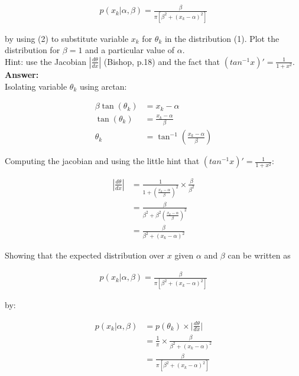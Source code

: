 \documentclass[a4paper]{article}
\begin{document}
\begin{eqnarray}
p(x_k | \alpha, \beta) = \frac{\beta}{\pi [\beta^2 + (x_k - \alpha)^2 ]}
\end{eqnarray}

by using (2) to substitute variable $x_k$ for $\theta_k$ in the distribution (1). Plot the distribution for $\beta = 1$ and a particular value of $\alpha$.\\
Hint: use the Jacobian $|\frac{d \theta}{d x }|$ (Bishop, p.18) and the fact that $(tan^{-1}x)' = \frac{1}{1 + x^2}$.\\



\textbf{Answer:}\\

Isolating variable $\theta_k$ using arctan:

\begin{align*}
\beta \tan(\theta_k) &= x_k - \alpha\\
\tan(\theta_k) &= \frac{x_k - \alpha}{\beta}\\
\theta_k &= \tan^{-1}(\frac{x_k - \alpha}{\beta})
\end{align*}

Computing the jacobian and using the little hint that $(tan^{-1}x)' = \frac{1}{1 + x^2}$:

\begin{align*}
|\frac{d \theta}{d x }| &= \frac{1}{1 + (\frac{x_k - \alpha}{\beta})^2} \times \frac{\beta}{\beta^2}\\
&= \frac{\beta}{\beta^2 + \beta^2(\frac{x_k - \alpha}{\beta})^2}\\
&= \frac{\beta}{ \beta^2 + (x_k - \alpha)^2}
\end{align*}

Showing that the expected distribution over $x$ given $\alpha$ and $\beta$ can be written as

\begin{align*}
p(x_k | \alpha, \beta) = \frac{\beta}{\pi [\beta^2 + (x_k - \alpha)^2 ]}
\end{align*}

by:

\begin{align*}
p(x_k | \alpha, \beta) &= p(\theta_k) \times \big| \frac{d \theta}{d x} \big|\\
&= \frac{1}{\pi} \times  \frac{\beta}{ \beta^2 + (x_k - \alpha)^2}\\
&= \frac{\beta}{\pi [\beta^2 + (x_k - \alpha)^2 ]}
\end{align*}
\end{document}
